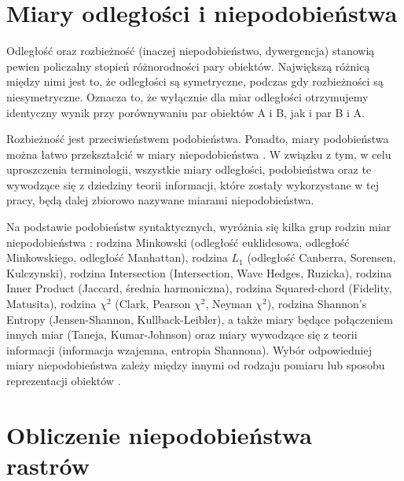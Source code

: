 \documentclass{amuthesis}
\begin{document}
\hypertarget{miary-odlegux142oux15bci-i-niepodobieux144stwa}{%
\section{Miary odległości i
niepodobieństwa}\label{miary-odlegux142oux15bci-i-niepodobieux144stwa}}

Odległość oraz rozbieżność (inaczej niepodobieństwo, dywergencja)
stanowią pewien policzalny stopień różnorodności pary obiektów.
Największą różnicą między nimi jest to, że odległości są symetryczne,
podczas gdy rozbieżności są niesymetryczne. Oznacza to, że wyłącznie dla
miar odległości otrzymujemy identyczny wynik przy porównywaniu par
obiektów A i B, jak i par B i A.

Rozbieżność jest przeciwieństwem podobieństwa. Ponadto, miary
podobieństwa można łatwo przekształcić w miary niepodobieństwa
\autocite{niesterowicz2016}. W związku z tym, w celu uproszczenia
terminologii, wszystkie miary odległości, podobieństwa oraz te wywodzące
się z dziedziny teorii informacji, które zostały wykorzystane w tej
pracy, będą dalej zbiorowo nazywane miarami niepodobieństwa.

Na podstawie podobieństw syntaktycznych, wyróżnia się kilka grup rodzin
miar niepodobieństwa \autocite{Cha2007}: rodzina Minkowski (odległość
euklidesowa, odległość Minkowskiego, odległość Manhattan), rodzina
\(L_1\) (odległość Canberra, Sorensen, Kulczynski), rodzina Intersection
(Intersection, Wave Hedges, Ruzicka), rodzina Inner Product (Jaccard,
średnia harmoniczna), rodzina Squared-chord (Fidelity, Matusita),
rodzina \(\chi^2\) (Clark, Pearson \(\chi^2\), Neyman \(\chi^2\)),
rodzina Shannon's Entropy (Jensen-Shannon, Kullback-Leibler), a także
miary będące połączeniem innych miar (Taneja, Kumar-Johnson) oraz miary
wywodzące się z teorii informacji (informacja wzajemna, entropia
Shannona). Wybór odpowiedniej miary niepodobieństwa zależy między innymi
od rodzaju pomiaru lub sposobu reprezentacji obiektów
\autocite{Cha2007}.

\hypertarget{obliczenie-niepodobieux144stwa-rastruxf3w}{%
\section{Obliczenie niepodobieństwa
rastrów}\label{obliczenie-niepodobieux144stwa-rastruxf3w}}
\end{document}
